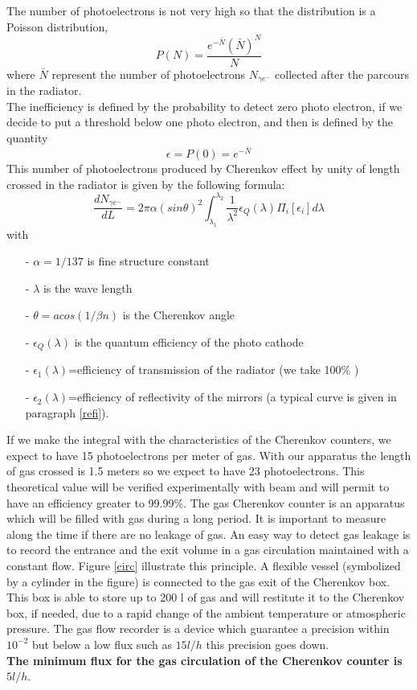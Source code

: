 \documentclass[12pt]{article}
\begin{document}
The number of photoelectrons is not very high so that the 
distribution is a Poisson distribution,
$$P(N)=\frac{e^{- \bar N}(\bar N)^N}{N\!}$$
where $\bar N$ represent the number of photoelectrons 
$N_{\gamma e^-}$ collected after the
parcours in the radiator.\\
The inefficiency is defined by the probability to detect zero photo electron, if
we decide to put a threshold below one photo electron, and then is defined 
by the quantity
\begin{equation}
\epsilon=P(0)=e^{- \bar N}
\label{eff}
\end{equation}
This number of photoelectrons produced by Cherenkov effect by unity of
length crossed in the radiator is given by the following formula:
$$\frac{dN_{\gamma e^-}}{dL}=2\pi \alpha (sin \theta)^2 
\int_{\lambda_1}^{\lambda_2}\frac{1}{\lambda^2}\epsilon_Q(\lambda)
\Pi_i[\epsilon_i]d\lambda$$
with
\begin{itemize}
\item[-]$\alpha=1/137$ is fine structure constant
\item[-]$\lambda$ is the wave length
\item[-]$\theta=acos(1/\beta n)$ is the Cherenkov angle
\item[-]$\epsilon_Q(\lambda)$ is the quantum efficiency of the photo cathode
\item[-]$\epsilon_1(\lambda)$=efficiency of transmission of the radiator (we
take 
100\% )
\item[-]$\epsilon_2(\lambda)$=efficiency of reflectivity of the mirrors 
(a typical curve is given in paragraph \ref{refi}).
\end{itemize}
If we make the integral with the characteristics of the Cherenkov counters, we
expect to have 15 photoelectrons per meter of gas. With our apparatus the
length of gas crossed is 1.5 meters so we expect to have 23 photoelectrons.
 This theoretical value will be verified experimentally with beam and 
will permit to have an efficiency 
greater to 99.99\%.
\newpage
{}
\label{des}
The gas Cherenkov counter is an apparatus which will be filled with gas during
a long period. It is important to measure along
the time if there are no leakage of gas. An easy way to detect gas leakage is 
to record the entrance and the exit volume in a gas circulation maintained
with a constant flow. Figure \ref{circ} illustrate this principle.
A flexible vessel (symbolized by a cylinder in the figure) 
is connected to the gas exit of the Cherenkov box. This box is
 able to store up to 200 l 
of gas and will restitute it to the Cherenkov box, if needed, due to a 
rapid change of the ambient
temperature or atmospheric pressure.
 The gas flow recorder is a device which guarantee a
precision within $10^{-2}$ but below a low flux such as $15 l/h$ this 
precision goes down. \\
{\bf The minimum flux for the gas circulation of the 
 Cherenkov counter is $5 l/h$}.\\
\end{document}
